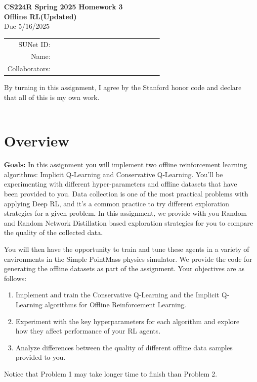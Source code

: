 \documentclass[12pt]{article}
\begin{document}
\begin{center}
{\Large \textbf{CS224R Spring 2025 Homework 3 \\ Offline RL(Updated)}}
\\ {\large Due 5/16/2025}

\begin{tabular}{rl}
SUNet ID: & $\hspace{6cm}$\\
Name: & \\
Collaborators: & 
\end{tabular}
\end{center}

\noindent By turning in this assignment, I agree by the Stanford honor code and declare
that all of this is my own work. \\
\\

\section*{Overview}

\textbf{Goals:} In this assignment you will implement two offline reinforcement learning algorithms: Implicit Q-Learning and Conservative Q-Learning. You'll be experimenting with different hyper-parameters and offline datasets that have been provided to you. Data collection is one of the most practical problems with applying Deep RL, and it's a common practice to try different exploration strategies for a given problem. In this assignment, we provide with you Random and Random Network Distillation based exploration strategies for you to compare the quality of the collected data.


You will then have the opportunity to train and tune these agents in a variety of environments in the Simple PointMass physics simulator. We provide the code for generating the offline datasets as part of the assignment. Your objectives are as follows:

\begin{enumerate} 
    \item Implement and train the Conservative Q-Learning and the Implicit Q-Learning algorithms for Offline Reinforcement Learning.
    \item Experiment with the key hyperparameters for each algorithm and explore how they affect performance of your RL agents.
    \item Analyze differences between the quality of different offline data samples provided to you. 
\end{enumerate}
Notice that Problem 1 may take longer time to finish than Problem 2.
\end{document}
